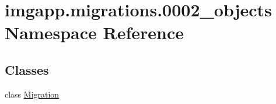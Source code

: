 \hypertarget{namespaceimgapp_1_1migrations_1_10002__objects}{}\section{imgapp.\+migrations.0002\+\_\+objects Namespace Reference}
\label{namespaceimgapp_1_1migrations_1_10002__objects}
\subsection*{Classes}
\begin{DoxyCompactItemize}
\item 
class \hyperlink{classimgapp_1_1migrations_1_10002__objects_1_1Migration}{Migration}
\end{DoxyCompactItemize}
